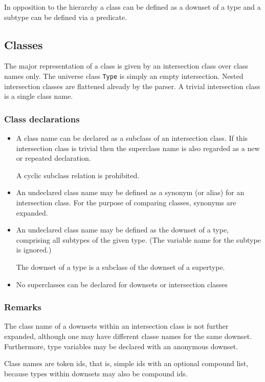 \documentclass{article}
\begin{document}
In opposition to the hierarchy a class can be defined as a downset of a type
and a subtype can be defined via a predicate.

\subsection{Classes}

The major representation of a class is given by an intersection class over
class names only. The universe class \texttt{Type} is simply an empty
intersection. Nested intersection classes are flattened already by the
parser. A trivial intersection class is a single class name.

\subsubsection*{Class declarations}
\begin{itemize}
\item A class name can be declared as a subclass of an intersection class. If
  this intersection class is trivial then the superclass name is also regarded
  as a new or repeated declaration.
  
  A cyclic subclass relation is prohibited.
\item An undeclared class name may be defined as a synonym (or alias) for an
  intersection class. For the purpose of comparing classes, synonyms are
  expanded.
\item An undeclared class name may be defined as the downset of a type,
  comprising all subtypes of the given type. (The variable name for the
  subtype is ignored.)
  
  The downset of a type is a subclass of the downset of a
  supertype.
\item No superclasses can be declared for downsets or intersection classes

\end{itemize}

\subsubsection*{Remarks}

The class name of a downsets within an intersection class is not further
expanded, although one may have different classe names for the same downset.
Furthermore, type variables may be declared with an anonymous downset.

Class names are token ids, that is, simple ids with an optional compound list,
because types within downsets may also be compound ids.
\end{document}
